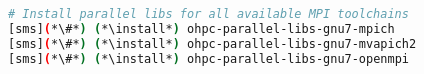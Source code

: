 
\begin{lstlisting}[language=bash,keywords={},upquote=true,keepspaces]
# Install parallel libs for all available MPI toolchains
[sms](*\#*) (*\install*) ohpc-parallel-libs-gnu7-mpich
[sms](*\#*) (*\install*) ohpc-parallel-libs-gnu7-mvapich2
[sms](*\#*) (*\install*) ohpc-parallel-libs-gnu7-openmpi
\end{lstlisting}
